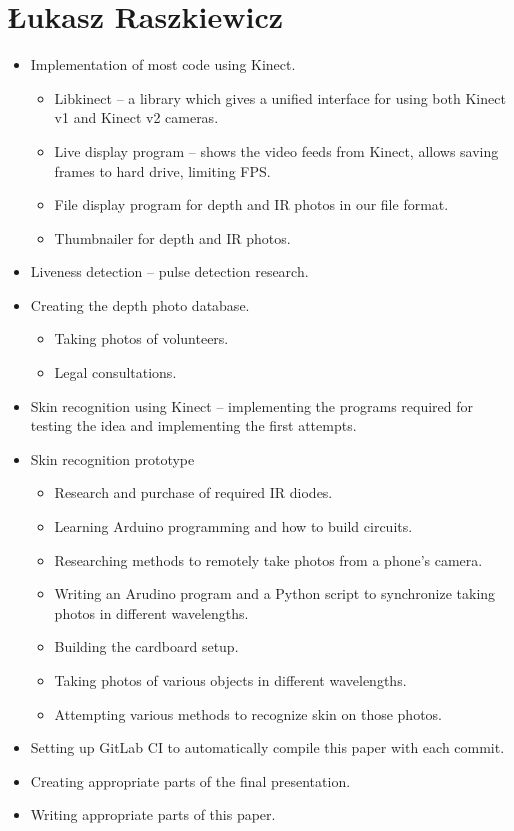     \section{Łukasz Raszkiewicz}
        \begin{itemize}
            \item Implementation of most code using Kinect.
            \begin{itemize}
                \item Libkinect -- a library which gives a unified interface for
                      using both Kinect v1 and Kinect v2 cameras.
                \item Live display program -- shows the video feeds from Kinect,
                      allows saving frames to hard drive, limiting FPS.
                \item File display program for depth and IR photos in our file format.
                \item Thumbnailer for depth and IR photos.
            \end{itemize}
            \item Liveness detection -- pulse detection research.
            \item Creating the depth photo database.
            \begin{itemize}
                \item Taking photos of volunteers.
                \item Legal consultations.
            \end{itemize}
            \item Skin recognition using Kinect -- implementing the programs required
                  for testing the idea and implementing the first attempts.
            \item Skin recognition prototype
            \begin{itemize}
                \item Research and purchase of required IR diodes.
                \item Learning Arduino programming and how to build circuits.
                \item Researching methods to remotely take photos from a phone's camera.
                \item Writing an Arudino program and a Python script to synchronize
                      taking photos in different wavelengths.
                \item Building the cardboard setup.
                \item Taking photos of various objects in different wavelengths.
                \item Attempting various methods to recognize skin on those photos.
            \end{itemize}
            \item Setting up GitLab CI to automatically compile this paper with each commit.
            \item Creating appropriate parts of the final presentation.
            \item Writing appropriate parts of this paper.
        \end{itemize}


